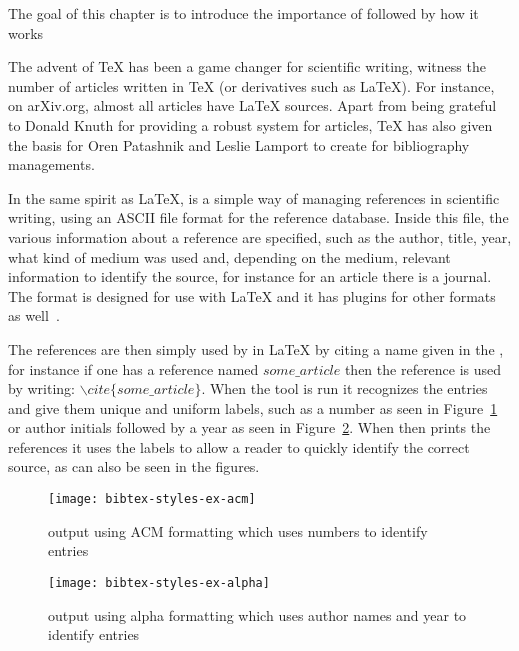 The goal of this chapter is to introduce the importance of {\bibtex}
followed by how it works

The advent of {\TeX} has been a game changer for scientific writing,
witness the number of articles written in {\TeX} (or derivatives such
as {\LaTeX}).  For instance, on arXiv.org, almost all articles have
{\LaTeX} sources.  Apart from being grateful to Donald Knuth for
providing a robust system for articles, {\TeX} has also given the
basis for Oren Patashnik and Leslie Lamport to create {\bibtex} for
bibliography managements.

In the same spirit as {\LaTeX}, {\bibtex} is a simple way of managing
references in scientific writing, using an ASCII file format for the
reference database.  Inside this file, the various information about a
reference are specified, such as the author, title, year, what kind of
medium was used and, depending on the medium, relevant information to
identify the source, for instance for an article there is a journal.
The {\bibtex} format is designed for use with {\LaTeX} and it has
plugins for other formats as well~\cite{bibtex_resource}.

The references are then simply used by in {\LaTeX} by citing a name
given in the {\bibtex}, for instance if one has a reference named
$some\_article$ then the reference is used by writing:
${\backslash}cite\{some\_article\}$.  When the {\bibtex} tool is run
it recognizes the entries and give them unique and uniform labels,
such as a number as seen in Figure~\ref{fig:bibtex_example_acm} or
author initials followed by a year as seen in
Figure~\ref{fig:bibtex_example_alpha}.  When {\bibtex} then prints the
references it uses the labels to allow a reader to quickly identify
the correct source, as can also be seen in the figures.

\begin{figure}[ht]
  \centering
  \texttt{[image: bibtex-styles-ex-acm]}
  \caption{{\bibtex} output using ACM formatting which uses numbers to
    identify entries}
\label{fig:bibtex_example_acm}
\end{figure}

\begin{figure}[ht]
  \centering
  \texttt{[image: bibtex-styles-ex-alpha]}
  \caption{{\bibtex} output using alpha formatting which uses author
    names and year to identify entries}
\label{fig:bibtex_example_alpha}
\end{figure}

